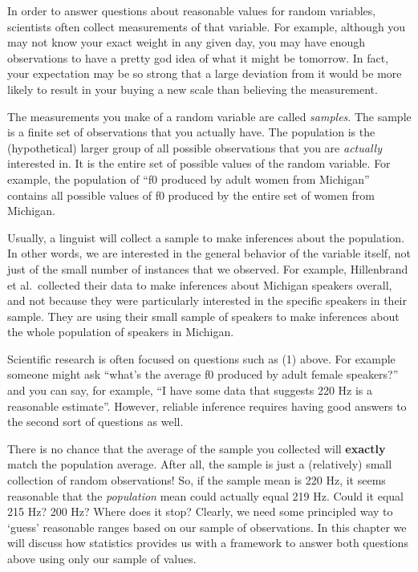 \documentclass[
]{book}
\begin{document}
In order to answer questions about reasonable values for random variables, scientists often collect measurements of that variable. For example, although you may not know your exact weight in any given day, you may have enough observations to have a pretty god idea of what it might be tomorrow. In fact, your expectation may be so strong that a large deviation from it would be more likely to result in your buying a new scale than believing the measurement.

The measurements you make of a random variable are called \emph{samples}. The sample is a finite set of observations that you actually have. The population is the (hypothetical) larger group of all possible observations that you are \emph{actually} interested in. It is the entire set of possible values of the random variable. For example, the population of ``f0 produced by adult women from Michigan'' contains all possible values of f0 produced by the entire set of women from Michigan.

Usually, a linguist will collect a sample to make inferences about the population. In other words, we are interested in the general behavior of the variable itself, not just of the small number of instances that we observed. For example, Hillenbrand et al.~collected their data to make inferences about Michigan speakers overall, and not because they were particularly interested in the specific speakers in their sample. They are using their small sample of speakers to make inferences about the whole population of speakers in Michigan.

Scientific research is often focused on questions such as (1) above. For example someone might ask ``what's the average f0 produced by adult female speakers?'' and you can say, for example, ``I have some data that suggests 220 Hz is a reasonable estimate''. However, reliable inference requires having good answers to the second sort of questions as well.

There is no chance that the average of the sample you collected will \textbf{exactly} match the population average. After all, the sample is just a (relatively) small collection of random observations! So, if the sample mean is 220 Hz, it seems reasonable that the \emph{population} mean could actually equal 219 Hz. Could it equal 215 Hz? 200 Hz? Where does it stop? Clearly, we need some principled way to `guess' reasonable ranges based on our sample of observations. In this chapter we will discuss how statistics provides us with a framework to answer both questions above using only our sample of values.
\end{document}
